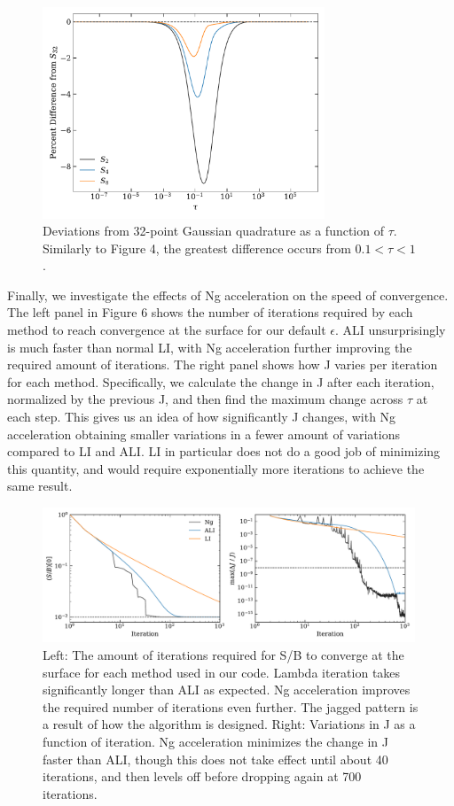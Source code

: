 \documentclass[12pt]{article}
\begin{document}
\begin{figure}[ht]
 \centering
 \includegraphics[width=0.75\textwidth]{quadrature.pdf}
 \caption{Deviations from 32-point Gaussian quadrature as a function of $\tau$. Similarly to Figure 4, the greatest difference occurs from $0.1 < \tau < 1$. }
\end{figure}

Finally, we investigate the effects of Ng acceleration on the speed of convergence. The left panel in Figure 6 shows the number of iterations required by each method to reach convergence at the surface for our default $\epsilon$. ALI unsurprisingly is much faster than normal LI, with Ng acceleration further improving the required amount of iterations. The right panel shows how J varies per iteration for each method. Specifically, we calculate the change in J after each iteration, normalized by the previous J, and then find the maximum change across $\tau$ at each step. This gives us an idea of how significantly J changes, with Ng acceleration obtaining smaller variations in a fewer amount of variations compared to LI and ALI. LI in particular does not do a good job of minimizing this quantity, and would require exponentially more iterations to achieve the same result.

\begin{figure}[ht]
 \centering
 \includegraphics[width=0.99\textwidth]{iterations.pdf}
 \caption{Left: The amount of iterations required for S/B to converge at the surface for each method used in our code. Lambda iteration takes significantly longer than ALI as expected. Ng acceleration improves the required number of iterations even further. The jagged pattern is a result of how the algorithm is designed. Right: Variations in J as a function of iteration. Ng acceleration minimizes the change in J faster than ALI, though this does not take effect until about 40 iterations, and then levels off before dropping again at 700 iterations.}
\end{figure}
\end{document}
